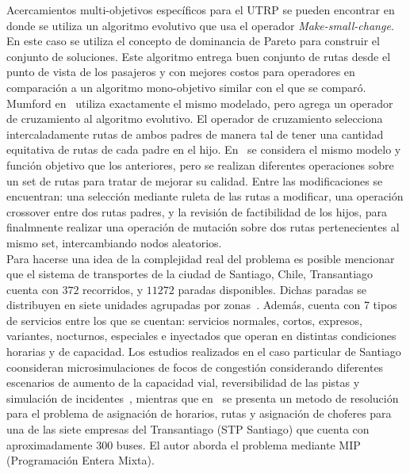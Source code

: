 Acercamientos multi-objetivos espec\'ificos para el UTRP se pueden encontrar en~\cite{zhang2010multi} donde se utiliza un algoritmo
evolutivo que usa el operador \emph{Make-small-change}. En este caso se utiliza el concepto de dominancia de Pareto para construir
el conjunto de soluciones. Este algoritmo entrega buen conjunto de rutas desde el punto de vista de los pasajeros y con mejores costos
para operadores en comparaci\'on a un algoritmo mono-objetivo similar con el que se compar\'o. Mumford en~\cite{NewHaEOps} utiliza exactamente
el mismo modelado, pero agrega un operador de cruzamiento al algoritmo evolutivo. El operador de cruzamiento selecciona intercaladamente
rutas de ambos padres de manera tal de tener una cantidad equitativa de rutas de cada padre en el hijo. En~\cite{GAUTRP}
se considera el mismo modelo y funci\'on objetivo que los anteriores, pero 
se realizan diferentes operaciones sobre un set de rutas para tratar de mejorar su calidad. Entre las modificaciones
se encuentran: una selecci\'on mediante ruleta de las rutas a modificar, una operaci\'on crossover entre dos rutas padres,
y la revisi\'on de factibilidad de los hijos, para finalmnente realizar una operaci\'on de mutaci\'on sobre dos rutas pertenecientes
al mismo set, intercambiando nodos aleatorios.\\

Para hacerse una idea de la complejidad real del problema es posible mencionar que el sistema de transportes de la ciudad de Santiago, Chile,
Transantiago cuenta con $372$ recorridos, y $11272$ paradas disponibles. Dichas paradas se distribuyen en siete unidades agrupadas por
zonas~\cite{datosGob}. Adem\'as, cuenta con 7 tipos de servicios entre los que se cuentan: servicios normales, cortos, expresos, variantes,
nocturnos, especiales e inyectados que operan en distintas condiciones horarias y de capacidad. Los estudios realizados en el caso
particular de Santiago coonsideran microsimulaciones de focos de congesti\'on considerando
diferentes escenarios de aumento de la capacidad vial, reversibilidad de las pistas y simulaci\'on de incidentes~\cite{alarcon2010}, 
mientras que en~\cite{cortes2009} se presenta un metodo de resoluci\'on para el problema de asignaci\'on de horarios, rutas y asignaci\'on
de choferes para una de las siete empresas del Transantiago (STP Santiago) que cuenta con aproximadamente 300 buses.
El autor aborda el problema mediante MIP (Programaci\'on Entera Mixta).
